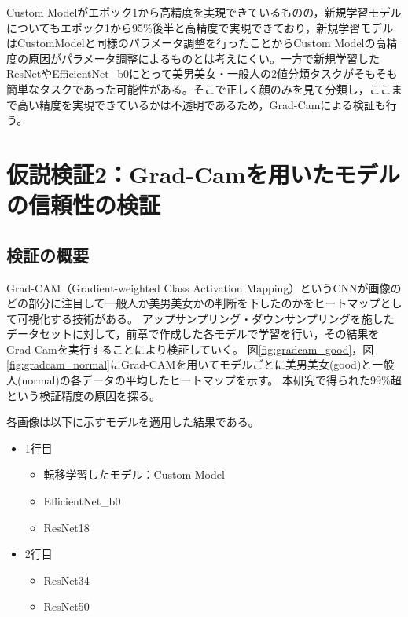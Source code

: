 \documentclass[a4paper,11pt,titlepage]{jsarticle}
\begin{document}

  




Custom Modelがエポック1から高精度を実現できているものの，新規学習モデルについてもエポック1から95\%後半と高精度で実現できており，新規学習モデルはCustomModelと同様のパラメータ調整を行ったことからCustom Modelの高精度の原因がパラメータ調整によるものとは考えにくい。一方で新規学習したResNetやEfficientNet\_b0にとって美男美女・一般人の2値分類タスクがそもそも簡単なタスクであった可能性がある。そこで正しく顔のみを見て分類し，ここまで高い精度を実現できているかは不透明であるため，Grad-Camによる検証も行う。



\clearpage

\section{仮説検証2：Grad-Camを用いたモデルの信頼性の検証}
\label{label:仮説検証2}
\subsection{検証の概要}
Grad-CAM（Gradient-weighted Class Activation Mapping）というCNNが画像のどの部分に注目して一般人か美男美女かの判断を下したのかをヒートマップとして可視化する技術がある\cite{gradcam}。
アップサンプリング・ダウンサンプリングを施したデータセットに対して，前章で作成した各モデルで学習を行い，その結果をGrad-Camを実行することにより検証していく。
図\ref{fig:gradcam_good}，図\ref{fig:gradcam_normal}にGrad-CAMを用いてモデルごとに美男美女(good)と一般人(normal)の各データの平均したヒートマップを示す。
本研究で得られた99\%超という検証精度の原因を探る。\par
各画像は以下に示すモデルを適用した結果である。
\begin{itemize}
	\item 1行目
	\begin{itemize}
	\item 転移学習したモデル：Custom Model
	\item EfficientNet\_b0
	\item ResNet18
	\end{itemize}
	\item 2行目
	\begin{itemize}
	\item ResNet34
	\item ResNet50
	\end{itemize}
\end{itemize}
\end{document}
